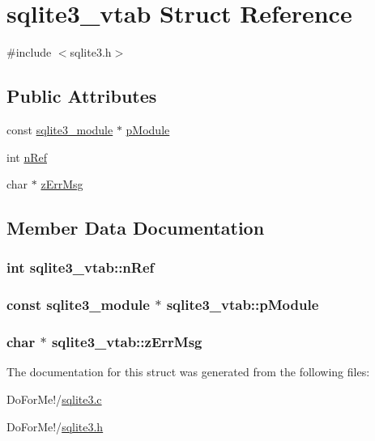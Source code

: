 \hypertarget{structsqlite3__vtab}{\section{sqlite3\-\_\-vtab Struct Reference}
\label{structsqlite3__vtab}
}


{\ttfamily \#include $<$sqlite3.\-h$>$}

\subsection*{Public Attributes}
\begin{DoxyCompactItemize}
\item 
const \hyperlink{structsqlite3__module}{sqlite3\-\_\-module} $\ast$ \hyperlink{structsqlite3__vtab_acf0d906e36b113669eaa883c5f8b5ba0}{p\-Module}
\item 
int \hyperlink{structsqlite3__vtab_ab3c80d385849bdd82363a0df7d6fcba8}{n\-Ref}
\item 
char $\ast$ \hyperlink{structsqlite3__vtab_a47331586775d674ae951b07ebb902fca}{z\-Err\-Msg}
\end{DoxyCompactItemize}


\subsection{Member Data Documentation}
\hypertarget{structsqlite3__vtab_ab3c80d385849bdd82363a0df7d6fcba8}{
\subsubsection[{n\-Ref}]{\setlength{\rightskip}{0pt plus 5cm}int sqlite3\-\_\-vtab\-::n\-Ref}}\label{structsqlite3__vtab_ab3c80d385849bdd82363a0df7d6fcba8}
\hypertarget{structsqlite3__vtab_acf0d906e36b113669eaa883c5f8b5ba0}{
\subsubsection[{p\-Module}]{\setlength{\rightskip}{0pt plus 5cm}const {\bf sqlite3\-\_\-module} $\ast$ sqlite3\-\_\-vtab\-::p\-Module}}\label{structsqlite3__vtab_acf0d906e36b113669eaa883c5f8b5ba0}
\hypertarget{structsqlite3__vtab_a47331586775d674ae951b07ebb902fca}{
\subsubsection[{z\-Err\-Msg}]{\setlength{\rightskip}{0pt plus 5cm}char $\ast$ sqlite3\-\_\-vtab\-::z\-Err\-Msg}}\label{structsqlite3__vtab_a47331586775d674ae951b07ebb902fca}


The documentation for this struct was generated from the following files\-:\begin{DoxyCompactItemize}
\item 
Do\-For\-Me!/\hyperlink{sqlite3_8c}{sqlite3.\-c}\item 
Do\-For\-Me!/\hyperlink{sqlite3_8h}{sqlite3.\-h}\end{DoxyCompactItemize}
